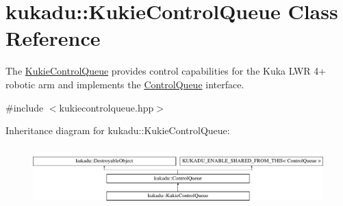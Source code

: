 \hypertarget{classkukadu_1_1KukieControlQueue}{\section{kukadu\-:\-:Kukie\-Control\-Queue Class Reference}
\label{classkukadu_1_1KukieControlQueue}
}


The \hyperlink{classkukadu_1_1KukieControlQueue}{Kukie\-Control\-Queue} provides control capabilities for the Kuka L\-W\-R 4+ robotic arm and implements the \hyperlink{classkukadu_1_1ControlQueue}{Control\-Queue} interface.  




{\ttfamily \#include $<$kukiecontrolqueue.\-hpp$>$}

Inheritance diagram for kukadu\-:\-:Kukie\-Control\-Queue\-:\begin{figure}[H]
\begin{center}
\leavevmode
\includegraphics[height=2.301370cm]{classkukadu_1_1KukieControlQueue}
\end{center}
\end{figure}
